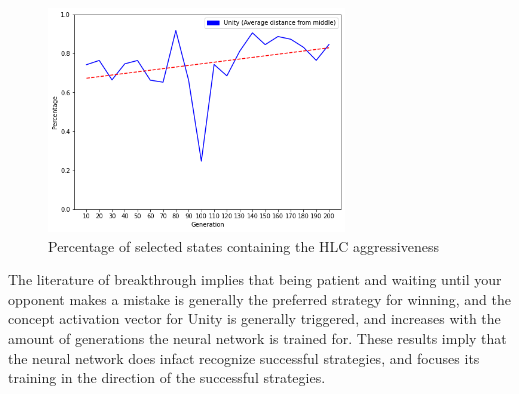 \begin{figure}[]
    \centering
    \includegraphics[width=0.7\textwidth]{graphics/unity_trend.png}
    \caption{Percentage of selected states containing the HLC aggressiveness}
    \label{fig:unity}
\end{figure}

The literature of breakthrough implies that being patient and waiting until your opponent makes a mistake is generally the preferred strategy for winning, and the concept activation vector for Unity is generally triggered, and increases with the amount of generations the neural network is trained for. These results imply that the neural network does infact recognize successful strategies, and focuses its training in the direction of the successful strategies.

